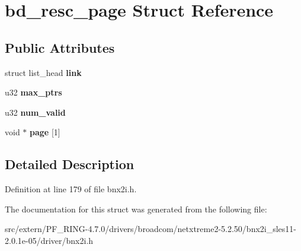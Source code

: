 \hypertarget{structbd__resc__page}{
\section{bd\_\-resc\_\-page Struct Reference}
\label{structbd__resc__page}
}
\subsection*{Public Attributes}
\begin{DoxyCompactItemize}
\item 
\hypertarget{structbd__resc__page_a962a22139243277d5e70798de7df8004}{
struct list\_\-head {\bfseries link}}
\label{structbd__resc__page_a962a22139243277d5e70798de7df8004}

\item 
\hypertarget{structbd__resc__page_a1b4c92b320eb109edf93879ed9d59591}{
u32 {\bfseries max\_\-ptrs}}
\label{structbd__resc__page_a1b4c92b320eb109edf93879ed9d59591}

\item 
\hypertarget{structbd__resc__page_a4c3434971eb87de72587511946ef652a}{
u32 {\bfseries num\_\-valid}}
\label{structbd__resc__page_a4c3434971eb87de72587511946ef652a}

\item 
\hypertarget{structbd__resc__page_a0b25e04846bb4e7a1784dde8b711a11d}{
void $\ast$ {\bfseries page} \mbox{[}1\mbox{]}}
\label{structbd__resc__page_a0b25e04846bb4e7a1784dde8b711a11d}

\end{DoxyCompactItemize}


\subsection{Detailed Description}


Definition at line 179 of file bnx2i.h.



The documentation for this struct was generated from the following file:\begin{DoxyCompactItemize}
\item 
src/extern/PF\_\-RING-\/4.7.0/drivers/broadcom/netxtreme2-\/5.2.50/bnx2i\_\-sles11-\/2.0.1e-\/05/driver/bnx2i.h\end{DoxyCompactItemize}
